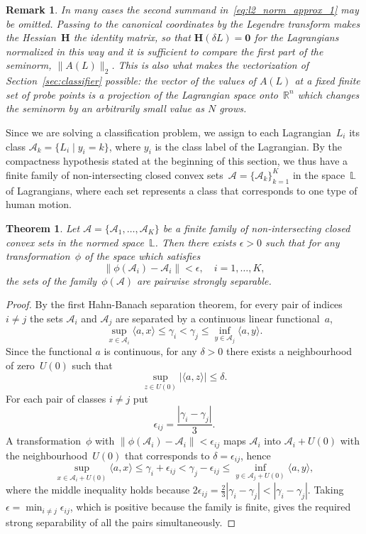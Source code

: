 \documentclass[sn-mathphys-num]{sn-jnl}
\theoremstyle{thmstylethree}
\theoremstyle{thmstyletwo}
\newtheorem{remark}{Remark}
\theoremstyle{thmstyleone}
\newtheorem{theorem}{Theorem}
\begin{document}
\begin{remark} \label{remark3}
In many cases the second summand in~\eqref{eq:l2_norm_approx_1} may be omitted. Passing to the canonical coordinates by the Legendre transform makes the Hessian~$\mathbf{H}$ the identity matrix, so that $\mathbf{H}(\delta L) = \mathbf{0}$ for the Lagrangians normalized in this way and it is sufficient to compare the first part of the seminorm, $\|A(L)\|_2$. This is also what makes the vectorization of Section~\ref{sec:classifier} possible: the vector of the values of $A(L)$ at a fixed finite set of probe points is a projection of the Lagrangian space onto~$\mathbb{R}^{n}$ which changes the seminorm by an arbitrarily small value as $N$ grows.
\end{remark}

Since we are solving a classification problem, we assign to each Lagrangian~$L_i$ its class $\mathcal{A}_{k} = \{L_i \mid y_i = k\}$, where $y_i$ is the class label of the Lagrangian. By the compactness hypothesis stated at the beginning of this section, we thus have a finite family of non-intersecting closed convex sets~$\mathcal{A} = \{\mathcal{A}_k\}_{k=1}^K$ in the space~$\mathbb{L}$ of Lagrangians, where each set represents a class that corresponds to one type of human motion.

\begin{theorem} \label{main_theorem}
Let $\mathcal{A} = \{\mathcal{A}_1, \dots, \mathcal{A}_K\}$ be a finite family of non-intersecting closed convex sets in the
normed space~$\mathbb{L}$. Then there exists $\epsilon > 0$ such that for any transformation~$\phi$ of the space which satisfies
\[
\|\phi(\mathcal{A}_{i}) - \mathcal{A}_{i}\| < \epsilon,
\quad i = 1, \dots, K,
\]
the sets of the family~$\phi(\mathcal{A})$ are pairwise strongly separable.
\end{theorem}

\begin{proof}
By the first Hahn-Banach separation theorem, for every pair of indices $i \neq j$ the sets $\mathcal{A}_i$ and $\mathcal{A}_j$ are separated by a continuous linear functional~$a$,
\[
\sup_{x \in \mathcal{A}_{i}}{\langle a, x \rangle}\leq \gamma_{i} < \gamma_{j} \leq \inf_{y \in \mathcal{A}_{j}}{\langle a, y \rangle}.
\]
Since the functional $a$ is continuous, for any $\delta > 0$ there exists a neighbourhood of zero~$U(0)$ such that
\[
\sup_{z \in U(0)}{|\langle a, z \rangle|} \leq \delta.
\]
For each pair of classes $i \neq j$ put
\[
\epsilon_{ij} = \frac{|\gamma_{i} - \gamma_{j}|}{3}.
\]
A transformation~$\phi$ with $\|\phi(\mathcal{A}_i) - \mathcal{A}_i\| < \epsilon_{ij}$ maps $\mathcal{A}_i$ into $\mathcal{A}_i + U(0)$ with the neighbourhood~$U(0)$ that corresponds to $\delta = \epsilon_{ij}$, hence
\[
\sup_{x \in \mathcal{A}_{i} + U(0)}{\langle a, x \rangle}\leq \gamma_{i} + \epsilon_{ij} < \gamma_{j} - \epsilon_{ij} \leq \inf_{y \in \mathcal{A}_{j} + U(0)}{\langle a, y \rangle},
\]
where the middle inequality holds because $2\epsilon_{ij} = \tfrac{2}{3}|\gamma_i - \gamma_j| < |\gamma_i - \gamma_j|$. Taking $\epsilon = \min_{i \neq j} \epsilon_{ij}$, which is positive because the family is finite, gives the required strong separability of all the pairs simultaneously.
\end{proof}
\end{document}
